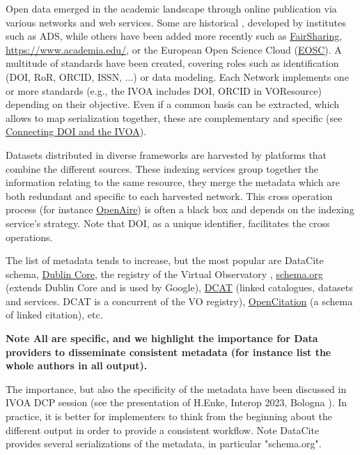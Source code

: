 \documentclass[11pt,a4paper]{ivoa}
\newcommand{\important}[1]{\textbf{\color{ivoacolor}Note #1 \\ }}
\begin{document}
Open data emerged in the academic landscape through online publication via various networks and web services.  Some are historical , developed by institutes such as ADS, while others have been added more recently such as \href{https://fairsharing.org/}{FairSharing}, \href{https://www.academia.edu/}{https://www.academia.edu/}, or the European Open Science Cloud (\href{https://eosc.eu/}{EOSC}).\newline
A multitude of standards have been created, covering roles such as identification (DOI, RoR, ORCID, ISSN, ...)  or data modeling. Each Network implements one or more standards (e.g., the IVOA includes DOI, ORCID in VOResource) depending on their objective. Even if a common basis can be extracted, which allows to map serialization together, these are complementary and specific (see \hyperlink{connecting-doi-and-the-ivoa}{Connecting DOI and the IVOA}).

Datasets distributed in diverse frameworks are harvested by platforms that combine the different sources. These indexing services group together the information relating to the same resource, they merge the metadata which are both redundant and specific to each harvested network. This cross operation process (for instance \href{https://www.openaire.eu/}{OpenAire}) is often a black box and depends on the indexing service's strategy. Note that DOI, as a unique identifier, facilitates the cross operations.

The list of metadata tends to increase, but the most popular are DataCite schema, \href{https://www.dublincore.org/}{Dublin Core}, the registry of the Virtual Observatory \citep{std:registry}, \href{https://schema.org/}{schema.org} (extends Dublin Core and is used by Google), \href{https://www.w3.org/TR/vocab-dcat-3/}{DCAT} (linked catalogues, datasets and services. DCAT is a concurrent of the VO registry), \href{https://opencitations.net/}{OpenCitation} \citep{Peroni_2020} (a schema of linked citation), etc.

\important{All are specific, and we highlight the importance for Data providers to disseminate consistent metadata (for instance list the whole authors in all output).}

The importance, but also the specificity of the metadata have been discussed in IVOA DCP session (see the presentation of H.Enke, Interop 2023, Bologna ). In practice, it is better for implementers to think from the beginning about the different output in order to provide a consistent workflow.\newline
Note DataCite provides several serializations of the metadata, in particular "schema.org".
\end{document}

